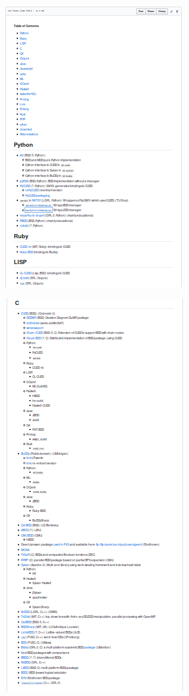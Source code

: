 \begin{container-fluid}
\begin{row-fluid}
\begin{span3}
\includegraphics{img/static/bddlib1.png}
\end{span3}
\begin{span3}
\includegraphics{img/static/bddlib2.png}

\end{span3}
\end{row-fluid}
\end{container-fluid}
